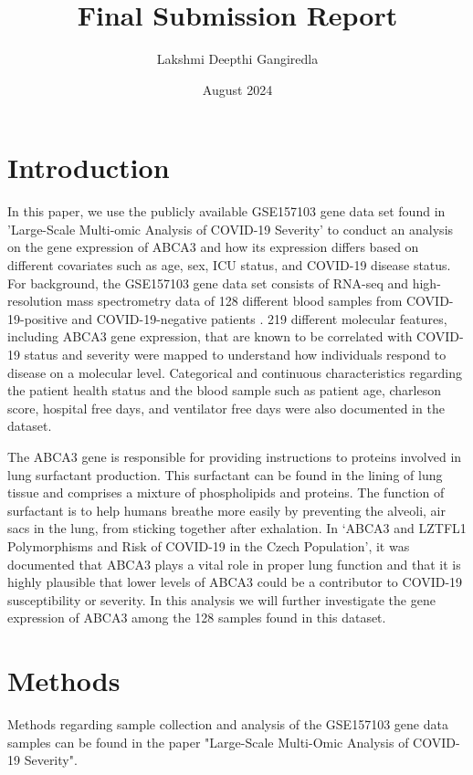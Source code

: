 \documentclass{article}
\title{Final Submission Report}
\author{Lakshmi Deepthi Gangiredla }
\date{August 2024}
\begin{document}
\maketitle
\tableofcontents 
\section{Introduction}
     \hspace{\parindent}In this paper, we use the publicly available GSE157103 gene data set found in 'Large-Scale Multi-omic Analysis of COVID-19 Severity' to conduct an analysis on the gene expression of ABCA3 and how its expression differs based on different covariates such as age, sex, ICU status, and COVID-19 disease status. For background, the GSE157103 gene data set consists of RNA-seq and high-resolution mass spectrometry data of 128 different blood samples from COVID-19-positive and COVID-19-negative patients \cite{Overmyer2021}. 219 different molecular features, including ABCA3 gene expression, that are known to be correlated with COVID-19 status and severity were mapped to understand how individuals respond to disease on a molecular level. Categorical and continuous characteristics regarding the patient health status and the blood sample such as patient age, charleson score, hospital free days, and ventilator free days were also documented in the dataset. 
        
         The ABCA3 gene is responsible for providing instructions to proteins involved in lung surfactant production. This surfactant can be found in the lining of lung tissue and comprises a mixture of phospholipids and proteins. The function of surfactant is to help humans breathe more easily by preventing the alveoli, air sacs in the lung, from sticking together after exhalation. In ‘ABCA3 and LZTFL1 Polymorphisms and Risk of COVID-19 in the Czech Population’, it was documented that ABCA3 plays a vital role in proper lung function and that it is highly plausible that lower levels of ABCA3 could be a contributor to COVID-19 susceptibility or severity\cite{Hubacek2023}.  In this analysis we will further investigate the gene expression of ABCA3 among the 128 samples found in this dataset. 
         
\section{Methods}

\hspace{\parindent} Methods regarding sample collection and analysis of the GSE157103 gene data samples can be found in the paper "Large-Scale
Multi-Omic Analysis of COVID-19 Severity". \cite{Overmyer2021}
\end{document}
